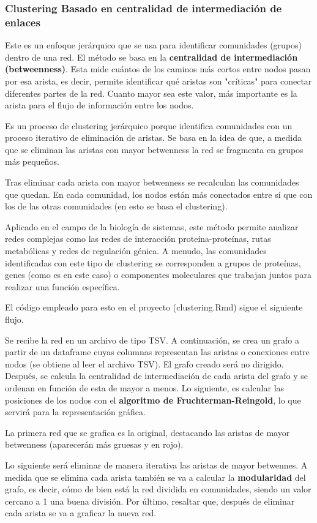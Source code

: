 \subsubsection{Clustering Basado en centralidad de intermediación de enlaces}

Este es un enfoque jerárquico que se usa para identificar comunidades (grupos) dentro de una red. El método se basa en la \textbf{centralidad de intermediación (betweenness)}. Esta mide cuántos de los caminos más cortos entre nodos pasan por esa arista, es decir, permite identificar qué aristas son "críticas" para conectar diferentes partes de la red. Cuanto mayor sea este valor, más importante es la arista para el flujo de información entre los nodos.

Es un proceso de clustering jerárquico porque identifica comunidades con un proceso iterativo de eliminación de aristas. Se basa en la idea de que, a medida que se eliminan las aristas con mayor betwenness la red se fragmenta en grupos más pequeños.

Tras eliminar cada arista con mayor betwenness se recalculan las comunidades que quedan. En cada comunidad, los nodos están más conectados entre sí que con los de las otras comunidades (en esto se basa el clustering).

Aplicado en el campo de la biología de sistemas, este método permite analizar redes complejas como las redes de interacción proteína-proteínas, rutas metabólicas y redes de regulación génica. A menudo, las comunidades identificadas con este tipo de clustering se corresponden a grupos de proteínas, genes (como es en este caso) o componentes moleculares que trabajan juntos para realizar una función específica.

El código empleado para esto en el proyecto (clustering.Rmd) sigue el siguiente flujo.

Se recibe la red en un archivo de tipo TSV. A continuación, se crea un grafo a partir de un dataframe cuyas columnas representan las aristas o conexiones entre nodos (se obtiene al leer el archivo TSV). El grafo creado será no dirigido. Después, se calcula la centralidad de intermediación de cada arista del grafo y se ordenan en función de esta de mayor a menos. Lo siguiente, es calcular las posiciones de los nodos con el \textbf{algoritmo de Fruchterman-Reingold}, lo que servirá para la representación gráfica.

La primera red que se grafica es la original, destacando las aristas de mayor betwenness (aparecerán más gruesas y en rojo).

Lo siguiente será eliminar de manera iterativa las aristas de mayor betwennes. A medida que se elimina cada arista también se va a calcular la \textbf{modularidad} del grafo, es decir, cómo de bien está la red dividida en comunidades, siendo un valor cercano a 1 una buena división. Por último, resaltar que, después de eliminar cada arista se va a graficar la nueva red.

